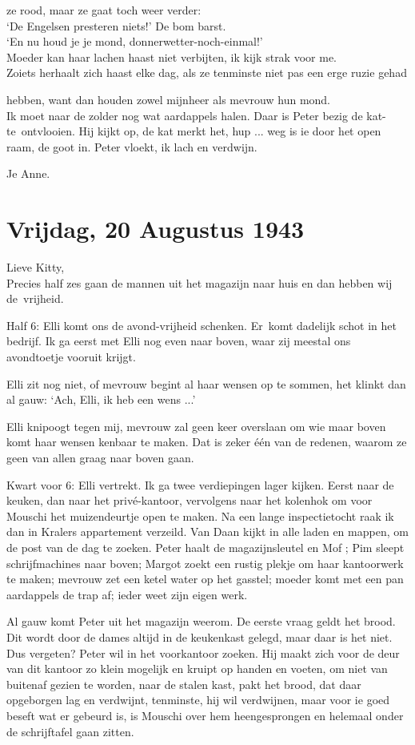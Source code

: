 \documentclass{book}
\begin{document}
ze rood, maar ze gaat toch weer verder:\\
`De Engelsen presteren niets!' De bom
barst.\\
`En nu houd je je mond, donnerwetter-noch-einmal!'\\
Moeder kan haar
lachen haast niet verbijten, ik kijk strak voor me.\\
Zoiets herhaalt zich haast
elke dag, als ze tenminste niet pas een erge ruzie gehad

hebben, want dan houden zowel mijnheer als mevrouw hun mond.\\
Ik moet naar de
zolder nog wat aardappels halen. Daar is Peter bezig de kat-te~ontvlooien. Hij
kijkt op, de kat merkt het, hup ... weg is ie door het open raam, de goot in.
Peter vloekt, ik lach en verdwijn.

Je Anne.

\section*{Vrijdag, 20 Augustus 1943}

Lieve Kitty,\\
Precies half zes gaan de mannen uit het magazijn naar huis en dan
hebben wij de~vrijheid.

Half 6: Elli komt ons de avond-vrijheid schenken. Er~komt dadelijk schot in het
bedrijf. Ik ga eerst met Elli nog even naar boven, waar zij meestal ons
avondtoetje vooruit krijgt.

Elli zit nog niet, of mevrouw begint al haar wensen op te sommen, het klinkt dan
al gauw: `Ach, Elli, ik heb een wens ...'

Elli knipoogt tegen mij, mevrouw zal geen keer overslaan om wie maar boven komt
haar wensen kenbaar te maken. Dat is zeker één van de redenen, waarom ze geen
van allen graag naar boven gaan.

Kwart voor 6: Elli vertrekt. Ik ga twee verdiepingen lager kijken. Eerst naar de
keuken, dan naar het privé-kantoor, vervolgens naar het kolenhok om voor Mouschi
het muizendeurtje open te maken. Na een lange inspectietocht raak ik dan in
Kralers appartement verzeild. Van Daan kijkt in alle laden en mappen, om de post
van de dag te zoeken. Peter haalt de magazijnsleutel en Mof ; Pim sleept
schrijfmachines naar boven; Margot zoekt een rustig plekje om haar kantoorwerk
te maken; mevrouw zet een ketel water op het gasstel; moeder komt met een pan
aardappels de trap af; ieder weet zijn eigen werk.

Al gauw komt Peter uit het magazijn weerom. De eerste vraag geldt het brood. Dit
wordt door de dames altijd in de keukenkast gelegd, maar daar is het niet. Dus
vergeten? Peter wil in het voorkantoor zoeken. Hij maakt zich voor de deur van
dit kantoor zo klein mogelijk en kruipt op handen en voeten, om niet van
buitenaf gezien te worden, naar de stalen kast, pakt het brood, dat daar
opgeborgen lag en verdwijnt, tenminste, hij wil verdwijnen, maar voor ie goed
beseft wat er gebeurd is, is Mouschi over hem heengesprongen en helemaal onder
de schrijftafel gaan zitten.
\end{document}
